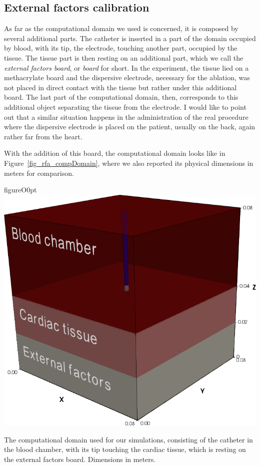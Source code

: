 \subsection{External factors calibration}
\label{sub_rfaExternalFactors}
As far as the computational domain we used is concerned, it is composed by several additional parts.
The catheter is inserted in a part of the domain occupied by blood, with its tip, the electrode, touching another part, occupied by the tissue.
The tissue part is then resting on an additional part, which we call the \emph{external factors board}, or \emph{board} for short.
In the experiment, the tissue lied on a methacrylate board and the dispersive electrode, necessary for the ablation, was not placed in direct contact with the tissue but rather under this additional board.
The last part of the computational domain, then, corresponds to this additional object separating the tissue from the electrode.
I would like to point out that a similar situation happens in the administration of the real procedure where the dispersive electrode is placed on the patient, usually on the back, again rather far from the heart.

With the addition of this board, the computational domain looks like in Figure~\ref{fig_rfa_compDomain}, where we also reported its physical dimensions in meters for comparison.
\begin{wrapfloat}{figure}{O}{0pt}
  \centering
    \includegraphics[width=0.5\columnwidth]{img/rfa/compDomain}
    \caption{The computational domain used for our simulations, consisting of the catheter in the blood chamber, with its tip touching the cardiac tissue, which is resting on the external factors board. Dimensions in meters.}
    \label{fig_rfa_compDomain}
\end{wrapfloat}

